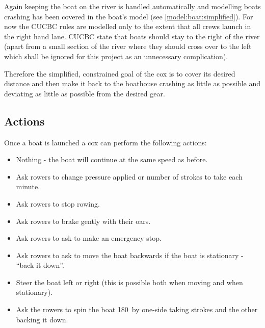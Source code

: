       Again keeping the boat on the river is handled automatically and modelling boats crashing has been covered in the boat's model (see \ref{model:boat:simplified}). For now the CUCBC rules are modelled only to the extent that all crews launch in the right hand lane. CUCBC state that boats should stay to the right of the river (apart from a small section of the river where they should cross over to the left which shall be ignored for this project as an unnecessary complication).
      
      Therefore the simplified, constrained goal of the cox is to cover its desired distance and then make it back to the boathouse crashing as little as possible and deviating as little as possible from the desired gear.

      \subsection{Actions} \label{model:cox:actions}
      Once a boat is launched a cox can perform the following actions:
      \begin{itemize}
        \item Nothing - the boat will continue at the same speed as before.
        \item Ask rowers to change pressure applied or number of
          strokes to take each minute.
        \item Ask rowers to stop rowing.
        \item Ask rowers to brake gently with their oars.
        \item Ask rowers to ask to make an emergency stop.
        \item Ask rowers to ask to move the boat backwards if the boat
          is stationary - ``back it down''.
        \item Steer the boat left or right (this is possible both when moving and when stationary).
        \item Ask the rowers to spin the boat 180\textdegree\ by
          one-side taking strokes and the other backing it down.
      \end{itemize}
      
